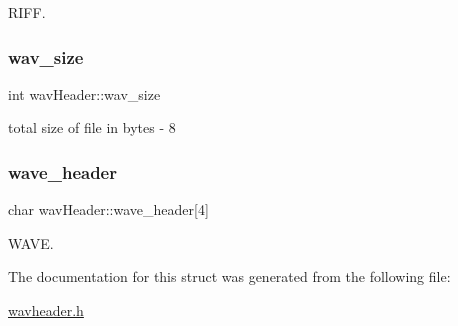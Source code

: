 R\+I\+FF. 

\mbox{\label{structwavHeader_adf513d299b6989b3046347077e077c82}} 
\subsubsection{\texorpdfstring{wav\+\_\+size}{wav\_size}}
{\footnotesize\ttfamily int wav\+Header\+::wav\+\_\+size}



total size of file in bytes -\/ 8 

\mbox{\label{structwavHeader_ae9a0bfdec6e8b7ba48dd27d7ac587f62}} 
\subsubsection{\texorpdfstring{wave\+\_\+header}{wave\_header}}
{\footnotesize\ttfamily char wav\+Header\+::wave\+\_\+header\mbox{[}4\mbox{]}}



W\+A\+VE. 



The documentation for this struct was generated from the following file\+:\begin{DoxyCompactItemize}
\item 
\hyperlink{wavheader_8h}{wavheader.\+h}\end{DoxyCompactItemize}

